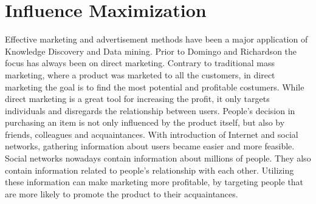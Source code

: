 \documentclass[english]{tktltiki}
\begin{document}
\newpage

\section{Influence Maximization}
\label{sec:influencemax}
Effective marketing and advertisement methods have been a major application of Knowledge Discovery and Data mining. 
Prior to Domingo and Richardson \cite{domingo01} the focus has always been on direct marketing. 
Contrary to traditional mass marketing, where a product was marketed to all the customers, in direct marketing the goal is to find the most potential and profitable costumers. 
While direct marketing is a great tool for increasing the profit, it only targets individuals and disregards the relationship between users. People's decision in purchasing an item is not only influenced by the product itself, but also by friends, colleagues and acquaintances. 
With introduction of Internet and social networks, gathering information about users became easier and more feasible. 
Social networks nowadays contain information about millions of people.
They also contain information related to people's relationship with each other. 
Utilizing these information can make marketing more profitable, by targeting people that are more likely to promote the product to their acquaintances. 
\end{document}
